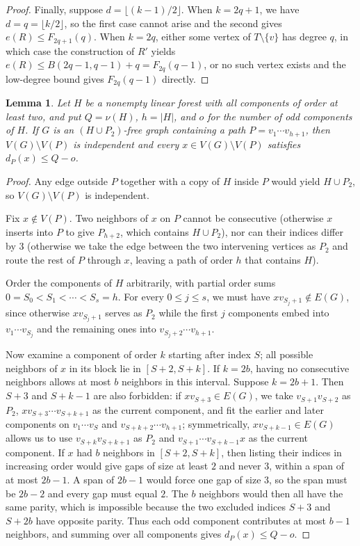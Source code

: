 \documentclass[10pt]{article}
\theoremstyle{compactplain}
\newtheorem{lemma}[theorem]{Lemma}
\theoremstyle{remark}\newtheorem{remark}[theorem]{Remark}
\begin{document}
\begin{proof}
Finally, suppose $d=\lfloor(k-1)/2\rfloor$. When $k=2q+1$, we have
$d=q=\lfloor k/2\rfloor$, so the first case cannot arise and the second
gives $e(R)\le F_{2q+1}(q)$. When $k=2q$, either some vertex of
$T\setminus\{v\}$ has degree $q$, in which case the construction of $R'$
yields $e(R)\le B(2q-1,q-1)+q=F_{2q}(q-1)$, or no such vertex exists and
the low-degree bound gives $F_{2q}(q-1)$ directly.
\end{proof}

\begin{lemma}\label{lem:p2-attachment}
Let $H$ be a nonempty linear forest with all components of order at
least two, and put $Q=\nu(H)$, $h=|H|$, and $o$ for the number of odd
components of $H$. If $G$ is an $(H\cup P_2)$-free graph containing a
path $P=v_1\cdots v_{h+1}$, then $V(G)\setminus V(P)$ is independent and
every $x\in V(G)\setminus V(P)$ satisfies $d_P(x)\le Q-o$.
\end{lemma}
\begin{proof}
Any edge outside $P$ together with a copy of $H$ inside $P$ would yield
$H\cup P_2$, so $V(G)\setminus V(P)$ is independent.

Fix $x\notin V(P)$. Two neighbors of $x$ on $P$ cannot be consecutive
(otherwise $x$ inserts into $P$ to give $P_{h+2}$, which contains
$H\cup P_2$), nor can their indices differ by $3$ (otherwise we take the
edge between the two intervening vertices as $P_2$ and route the rest of
$P$ through $x$, leaving a path of order $h$ that contains $H$).

Order the components of $H$ arbitrarily, with partial order sums
$0=S_0<S_1<\cdots<S_s=h$. For every $0\le j\le s$, we must have
$xv_{S_j+1}\notin E(G)$, since otherwise $xv_{S_j+1}$ serves as $P_2$
while the first $j$ components embed into $v_1\cdots v_{S_j}$ and the
remaining ones into $v_{S_j+2}\cdots v_{h+1}$.

Now examine a component of order $k$ starting after index $S$; all
possible neighbors of $x$ in its block lie in $[S+2,S+k]$. If $k=2b$,
having no consecutive neighbors allows at most $b$ neighbors in this
interval. Suppose $k=2b+1$. Then $S+3$ and $S+k-1$ are also forbidden:
if $xv_{S+3}\in E(G)$, we take $v_{S+1}v_{S+2}$ as $P_2$,
$xv_{S+3}\cdots v_{S+k+1}$ as the current component, and fit the earlier
and later components on $v_1\cdots v_S$ and
$v_{S+k+2}\cdots v_{h+1}$; symmetrically, $xv_{S+k-1}\in E(G)$ allows us
to use $v_{S+k}v_{S+k+1}$ as $P_2$ and $v_{S+1}\cdots v_{S+k-1}x$ as the
current component. If $x$ had $b$ neighbors in $[S+2,S+k]$, then listing
their indices in increasing order would give gaps of size at least $2$
and never $3$, within a span of at most $2b-1$. A span of $2b-1$ would
force one gap of size $3$, so the span must be $2b-2$ and every gap must
equal $2$. The $b$ neighbors would then all have the same parity, which
is impossible because the two excluded indices $S+3$ and $S+2b$ have
opposite parity. Thus each odd component contributes at most $b-1$
neighbors, and summing over all components gives $d_P(x)\le Q-o$.
\end{proof}
\end{document}
